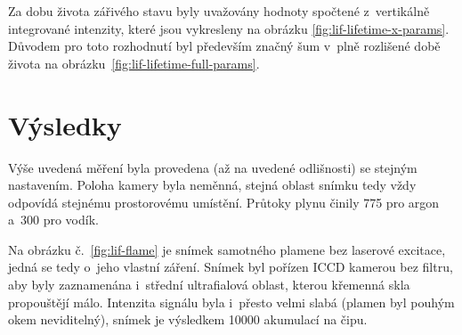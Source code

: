 \begin{table}
	\centering
	\caption{Spektrální čáry selenu použité pro LIF a~jejich parametry.
		Sloupec $\transmittance$ je propustnost filtru před kamerou
		a~$\qeff$ je kvantová účinnost kamery.
		První čára (\SI{196.026}{\nano\metre}) je zároveň čárou excitační.}
	\label{tab:lif-liflines}
\end{table}

Za dobu života zářivého stavu byly uvažovány hodnoty spočtené z~vertikálně
integrované intenzity,
které jsou vykresleny na obrázku \ref{fig:lif-lifetime-x-params}.
Důvodem pro toto rozhodnutí byl především značný šum v~plně rozlišené
době života na obrázku~\ref{fig:lif-lifetime-full-params}.

\section{Výsledky}
\label{sec:lif-results}
Výše uvedená měření byla provedena (až na uvedené odlišnosti) se stejným
nastavením.
Poloha kamery byla neměnná, stejná oblast snímku tedy vždy odpovídá stejnému
prostorovému umístění.
Průtoky plynu činily \SI{775}{\sccm} pro argon
a~\SI{300}{\sccm} pro vodík.

Na obrázku č.~\ref{fig:lif-flame} je snímek samotného plamene bez laserové
excitace, jedná se tedy o~jeho vlastní záření.
Snímek byl pořízen ICCD kamerou bez filtru, aby byly zaznamenána i~střední
ultrafialová oblast, kterou křemenná skla propouštějí málo.
Intenzita signálu byla i~přesto velmi slabá
(plamen byl pouhým okem neviditelný),
snímek je výsledkem \num{10000} akumulací na čipu.

